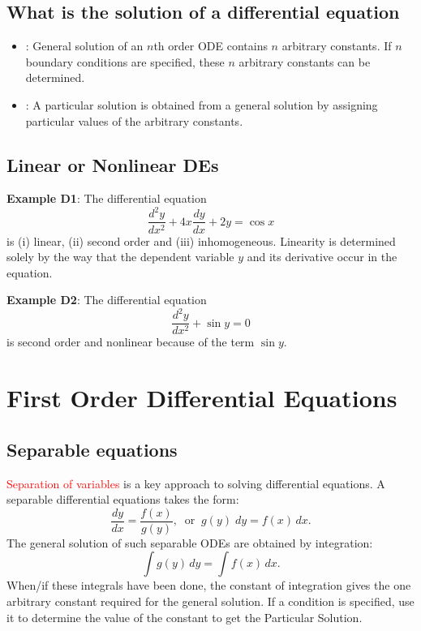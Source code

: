 \documentclass{article}
\begin{document}
\subsection{What is the solution of a differential equation}

\begin{itemize}
\item
{}: General solution of an $n$th
order ODE contains $n$ arbitrary constants. If $n$ boundary conditions
are specified, these $n$ arbitrary constants can be determined.
\item
{}: A particular  solution is
obtained from a general solution by assigning particular values of
the arbitrary constants.
\end{itemize}


\subsection{Linear or Nonlinear DEs}

\textbf{Example D1}: The differential equation
$$
 \frac{ d^2 y}{d x^2} +4 x \frac{ d y}{d x}+ 2y= \cos x
$$
is (i) linear, (ii) second order and (iii)  inhomogeneous.
Linearity is determined solely by the way that the dependent variable
$y$ and its derivative occur in the equation.

\textbf{Example D2}: The differential equation
$$
 \frac{ d^2 y}{d x^2} + \sin y = 0
$$
is second order and nonlinear because of the term $\sin y$.


\section{First Order Differential Equations}
\subsection{Separable equations}

\textcolor{red}{Separation of variables} is a key approach to solving differential equations. A separable
differential equations takes the form:
$$
\frac{dy}{dx} = \frac{f(x)}{g(y)}, \;\; \mbox{or} \;\; g(y)\; dy =  f(x)
\, dx.
$$
The general solution of such separable ODEs are obtained by integration:
$$
\int {g(y)}\, dy  = \int f(x) \, dx.
$$
When/if these integrals have been done, the constant of integration
gives the one arbitrary constant required for the general
solution. If a condition is specified, use it to determine the
value of the constant to get the Particular Solution.
\end{document}
